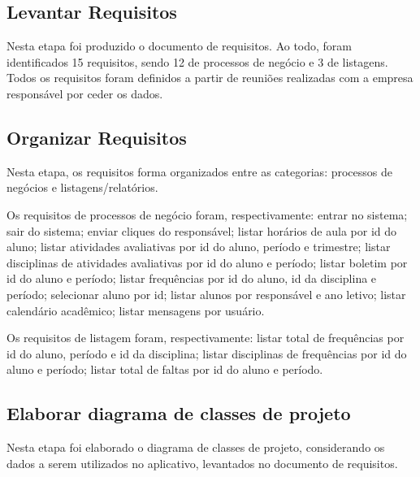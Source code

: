 \subsection{Levantar Requisitos}

Nesta etapa foi produzido o documento de requisitos. Ao todo, foram identificados 15 requisitos, sendo 12 de processos de negócio e 3 de listagens. Todos os requisitos foram definidos a partir de reuniões realizadas com a empresa responsável por ceder os dados.

\subsection{Organizar Requisitos}

Nesta etapa, os requisitos forma organizados entre as categorias: processos de negócios e listagens/relatórios.

Os requisitos de processos de negócio foram, respectivamente: entrar no sistema; sair do sistema; enviar cliques do responsável; listar horários de aula por id do aluno; listar atividades avaliativas por id do aluno, período e trimestre; listar disciplinas de atividades avaliativas por id do aluno e período; listar boletim por id do aluno e período; listar frequências por id do aluno, id da disciplina e período; selecionar aluno por id; listar alunos por responsável e ano letivo; listar calendário acadêmico; listar mensagens por usuário.

Os requisitos de listagem foram, respectivamente: listar total de frequências por id do aluno, período e id da disciplina; listar disciplinas de frequências por id do aluno e período; listar total de faltas por id do aluno e período.

\subsection{Elaborar diagrama de classes de projeto}

Nesta etapa foi elaborado o diagrama de classes de projeto, considerando os dados a serem utilizados no aplicativo, levantados no documento de requisitos.

